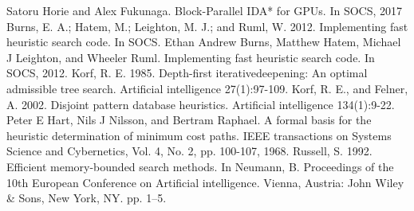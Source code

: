 \documentclass[a4paper,11pt,oneside,openany]{jsbook}
\begin{document}
\begin{thebibliography}{10}
   Satoru Horie and Alex Fukunaga. Block-Parallel IDA* for GPUs. In SOCS, 2017 
   Burns, E. A.; Hatem, M.; Leighton,  M. J.; and Ruml, W. 2012. Implementing fast heuristic search code. In SOCS.
  Ethan Andrew Burns, Matthew Hatem, Michael J Leighton, and Wheeler Ruml. Implementing fast heuristic search code. In SOCS, 2012.
  Korf, R. E. 1985. Depth-first iterativedeepening: An optimal admissible tree search. Artificial intelligence 27(1):97-109.
  Korf, R. E., and Felner, A. 2002. Disjoint pattern database heuristics. Artificial intelligence 134(1):9-22.
  Peter E Hart, Nils J Nilsson, and Bertram Raphael. A formal basis for the heuristic determination of minimum cost paths. IEEE transactions on Systems Science and Cybernetics, Vol. 4, No. 2, pp. 100-107, 1968. 
  Russell, S. 1992. Efficient memory-bounded search methods. In Neumann, B. Proceedings of the 10th European Conference on Artificial intelligence. Vienna, Austria: John Wiley \& Sons, New York, NY. pp. 1–5.

\end{thebibliography}
\end{document}
